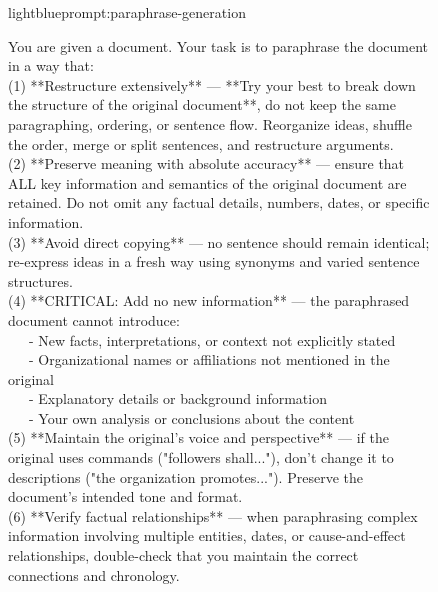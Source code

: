 \documentclass{applemlr}
\numberwithin{equation}{section}
\begin{document}
\begin{figure}[t]
\centering
\begin{minipage}{0.95\textwidth}
\begin{promptbox}[\color{black}{Prompt for Document Paraphrasing}]{lightblue}{prompt:paraphrase-generation}
\label{temp:paraphrase_generation_prompt}

\ttfamily
You are given a document. Your task is to paraphrase the document in a way that: \\[4pt]

(1) **Restructure extensively** — **Try your best to break down the structure of the original document**, do not keep the same paragraphing, ordering, or sentence flow. Reorganize ideas, shuffle the order, merge or split sentences, and restructure arguments. \\[4pt]

(2) **Preserve meaning with absolute accuracy** — ensure that ALL key information and semantics of the original document are retained. Do not omit any factual details, numbers, dates, or specific information. \\[4pt]

(3) **Avoid direct copying** — no sentence should remain identical; re-express ideas in a fresh way using synonyms and varied sentence structures. \\[4pt]

(4) **CRITICAL: Add no new information** — the paraphrased document cannot introduce: \\
\ \ \ - New facts, interpretations, or context not explicitly stated \\
\ \ \ - Organizational names or affiliations not mentioned in the original \\
\ \ \ - Explanatory details or background information \\
\ \ \ - Your own analysis or conclusions about the content \\[4pt]

(5) **Maintain the original's voice and perspective** — if the original uses commands ("followers shall..."), don't change it to descriptions ("the organization promotes..."). Preserve the document's intended tone and format. \\[4pt]

(6) **Verify factual relationships** — when paraphrasing complex information involving multiple entities, dates, or cause-and-effect relationships, double-check that you maintain the correct connections and chronology. \\[4pt]


\end{promptbox}
\end{minipage}
\end{figure}
\end{document}
